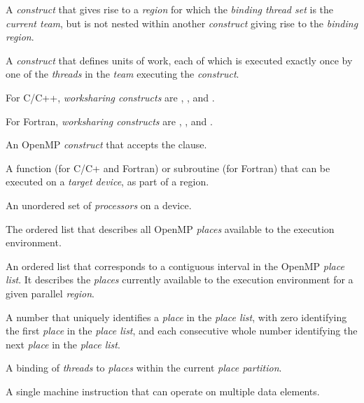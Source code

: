\glossarydefstart
A \emph{construct} that gives rise to a \emph{region} for which the 
\emph{binding thread set} is the \emph{current team}, but is not nested 
within another \emph{construct} giving rise to the \emph{binding region}.
\glossarydefend

\glossarydefstart
A \emph{construct} that defines units of work, each of which is executed 
exactly once by one of the \emph{threads} in the \emph{team} executing 
the \emph{construct}.

For C/C++, \emph{worksharing constructs} are , , 
and .

For Fortran, \emph{worksharing constructs} are , , 
 and .
\glossarydefend

\glossarydefstart
An OpenMP \emph{construct} that accepts the  clause.
\glossarydefend

\glossarydefstart
A function (for C/C+ and Fortran) or subroutine (for Fortran) that can be
executed on a \emph{target device}, as part of a  region.
\glossarydefend

\glossarydefstart
An unordered set of \emph{processors} on a device.
\glossarydefend

\glossarydefstart
The ordered list that describes all OpenMP \emph{places} available to 
the execution environment.
\glossarydefend

\glossarydefstart
An ordered list that corresponds to a contiguous interval in the OpenMP 
\emph{place list}. It describes the \emph{places} currently available to 
the execution environment for a given parallel \emph{region}.
\glossarydefend

\glossarydefstart
A number that uniquely identifies a \emph{place} in the \emph{place list}, 
with zero identifying the first \emph{place} in the \emph{place list}, and 
each consecutive whole number identifying the next \emph{place} in the 
\emph{place list}.
\glossarydefend

\glossarydefstart
A binding of \emph{threads} to \emph{places} within the current \emph{place partition}.
\glossarydefend

\glossarydefstart
A single machine instruction that can operate on multiple data elements.
\glossarydefend

